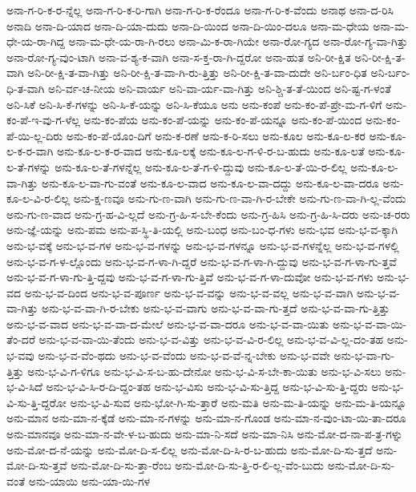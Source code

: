 {ಅನಾ-ಗ-ರಿ-ಕ-ರ-ನ್ನೆಲ್ಲ
ಅನಾ-ಗ-ರಿ-ಕ-ರಿ-ಗಾಗಿ
ಅನಾ-ಗ-ರಿ-ಕ-ರೆಂದೂ
ಅನಾ-ಗ-ರಿ-ಕ-ವೆಂದು
ಅನಾಥ
ಅನಾ-ದ-ರಿಸಿ
ಅನಾದಿ
ಅನಾ-ದಿ-ಯಾದ
ಅನಾ-ದಿ-ಯಾ-ದುದು
ಅನಾ-ದಿ-ಯಿಂದ
ಅನಾ-ದಿ-ಯಿಂ-ದಲೂ
ಅನಾ-ಮ-ಧೇಯ
ಅನಾ-ಮ-ಧೇ-ಯ-ರಾ-ಗಿದ್ದ
ಅನಾ-ಮ-ಧೇ-ಯ-ರಾ-ಗಿ-ರಲು
ಅನಾ-ಮಿ-ಕ-ರಾ-ಗಿಯೇ
ಅನಾ-ರೋ-ಗ್ಯದ
ಅನಾ-ರೋ-ಗ್ಯ-ವಾ-ಗಿತ್ತು
ಅನಾ-ರೋ-ಗ್ಯ-ವುಂ-ಟಾಗಿ
ಅನಾ-ವ-ಶ್ಯ-ಕ-ವಾಗಿ
ಅನಾ-ಸ-ಕ್ತ-ರಾ-ಗಿ-ದ್ದರೋ
ಅನಾ-ಹುತ
ಅನಿ-ರೀ-ಕ್ಷಿತ
ಅನಿ-ರೀ-ಕ್ಷಿ-ತ-ವಾಗಿ
ಅನಿ-ರೀ-ಕ್ಷಿ-ತ-ವಾ-ಗಿತ್ತು
ಅನಿ-ರೀ-ಕ್ಷಿ-ತ-ವಾ-ಗಿ-ರು-ತ್ತಿತ್ತು
ಅನಿ-ರೀ-ಕ್ಷಿ-ತ-ವಾ-ದುದೇ
ಅನಿ-ರ್ಬಂ-ಧಿತ
ಅನಿ-ರ್ಬಂ-ಧಿ-ತ-ವಾಗಿ
ಅನಿ-ರ್ವ-ಚ-ನೀಯ
ಅನಿ-ವಾರ್ಯ
ಅನಿ-ವಾ-ರ್ಯ-ವಾ-ಗಿತ್ತು
ಅನಿ-ಶ್ಚಿ-ತ-ತೆ-ಯಿಂದ
ಅನಿ-ಷ್ಟ-ಗ-ಳಂತೆ
ಅನಿ-ಸಿಕೆ
ಅನಿ-ಸಿ-ಕೆ-ಗಳನ್ನು
ಅನಿ-ಸಿ-ಕೆ-ಯನ್ನು
ಅನಿ-ಸಿ-ಕೆಯೂ
ಅನು
ಅನು-ಕಂಪೆ
ಅನು-ಕಂ-ಪೆ-ಪ್ರೇ-ಮ-ಗ-ಳಿಗೆ
ಅನು-ಕಂ-ಪೆ-ಇ-ವು-ಗ-ಳೆಲ್ಲ
ಅನು-ಕಂ-ಪೆಯ
ಅನು-ಕಂ-ಪೆ-ಯನ್ನು
ಅನು-ಕಂ-ಪೆ-ಯನ್ನೂ
ಅನು-ಕಂ-ಪೆ-ಯಿಂದ
ಅನು-ಕಂ-ಪೆ-ಯಿ-ಲ್ಲ-ದಿರು
ಅನು-ಕಂ-ಪೆ-ಯೊಂ-ದಿಗೆ
ಅನು-ಕ-ರಣೆ
ಅನು-ಕ-ರಿ-ಸಲು
ಅನು-ಕೂಲ
ಅನು-ಕೂ-ಲ-ಕರ
ಅನು-ಕೂ-ಲ-ಕ-ರ-ವಾಗಿ
ಅನು-ಕೂ-ಲ-ಕ-ರ-ವಾದ
ಅನು-ಕೂ-ಲಕ್ಕೆ
ಅನು-ಕೂ-ಲ-ಗ-ಳಿ-ರ-ಬ-ಹುದು
ಅನು-ಕೂ-ಲತೆ
ಅನು-ಕೂ-ಲ-ತೆ-ಗಳನ್ನು
ಅನು-ಕೂ-ಲ-ತೆ-ಗಳನ್ನೆಲ್ಲ
ಅನು-ಕೂ-ಲ-ತೆ-ಗ-ಳಿ-ದ್ದುವು
ಅನು-ಕೂ-ಲ-ತೆ-ಯಿ-ರ-ಲಿಲ್ಲ
ಅನು-ಕೂ-ಲ-ವಾ-ಗಿತ್ತು
ಅನು-ಕೂ-ಲ-ವಾ-ಗು-ವಂತೆ
ಅನು-ಕೂ-ಲ-ವಾದ
ಅನು-ಕೂ-ಲ-ವಾ-ದದ್ದು
ಅನು-ಕೂ-ಲ-ವಾ-ದರೂ
ಅನು-ಕೂ-ಲ-ವಿ-ರ-ಲಿಲ್ಲ
ಅನು-ಕ್ಷ-ಣವೂ
ಅನು-ಗು-ಣ-ವಾಗಿ
ಅನು-ಗು-ಣ-ವಾ-ಗಿ-ರ-ಬೇಕೇ
ಅನು-ಗು-ಣ-ವಾ-ಗಿ-ಲ್ಲ-ವೆಂದು
ಅನು-ಗು-ಣ-ವಾದ
ಅನು-ಗ್ರ-ಹ-ವಿ-ಲ್ಲದೆ
ಅನು-ಗ್ರ-ಹಿ-ಸ-ಬೇ-ಕೆಂದು
ಅನು-ಗ್ರ-ಹಿಸಿ
ಅನು-ಗ್ರ-ಹಿ-ಸಿ-ದರು
ಅನು-ಚ-ರರು
ಅನು-ಜ್ಞೆ-ಯನ್ನು
ಅನು-ಪಮ
ಅನು-ಪ-ಸ್ಥಿ-ತಿ-ಯಲ್ಲಿ
ಅನು-ಬಂಧ
ಅನು-ಬಂ-ಧ-ಗಳು
ಅನು-ಭವ
ಅನು-ಭ-ವ-ಕ್ಕಾಗಿ
ಅನು-ಭ-ವಕ್ಕೆ
ಅನು-ಭ-ವ-ಗಳ
ಅನು-ಭ-ವ-ಗಳನ್ನು
ಅನು-ಭ-ವ-ಗಳನ್ನೂ
ಅನು-ಭ-ವ-ಗಳನ್ನೆಲ್ಲ
ಅನು-ಭ-ವ-ಗಳಲ್ಲಿ
ಅನು-ಭ-ವ-ಗ-ಳ-ಲ್ಲೊಂದು
ಅನು-ಭ-ವ-ಗ-ಳಾ-ಗಿ-ದ್ದರೆ
ಅನು-ಭ-ವ-ಗ-ಳಾ-ಗಿ-ದ್ದುವು
ಅನು-ಭ-ವ-ಗ-ಳಾ-ಗು-ತ್ತವೆ
ಅನು-ಭ-ವ-ಗ-ಳಾ-ಗು-ತ್ತಿ-ದ್ದವು
ಅನು-ಭ-ವ-ಗ-ಳಾ-ಗು-ತ್ತಿವೆ
ಅನು-ಭ-ವ-ಗ-ಳಾ-ದುವೋ
ಅನು-ಭ-ವ-ಗಳು
ಅನು-ಭ-ವದ
ಅನು-ಭ-ವ-ದಿಂದ
ಅನು-ಭ-ವ-ಪೂರ್ಣ
ಅನು-ಭ-ವ-ವನ್ನು
ಅನು-ಭ-ವ-ವಲ್ಲ
ಅನು-ಭ-ವ-ವಾಗಿ
ಅನು-ಭ-ವ-ವಾ-ಗಿತ್ತು
ಅನು-ಭ-ವ-ವಾ-ಗಿ-ರ-ಬೇಕು
ಅನು-ಭ-ವ-ವಾಗು
ಅನು-ಭ-ವ-ವಾ-ಗು-ತ್ತದೆ
ಅನು-ಭ-ವ-ವಾ-ಗು-ತ್ತಿತ್ತು
ಅನು-ಭ-ವ-ವಾದ
ಅನು-ಭ-ವ-ವಾ-ದ-ಮೇಲೆ
ಅನು-ಭ-ವ-ವಾ-ದರೂ
ಅನು-ಭ-ವ-ವಾ-ಯಿತು
ಅನು-ಭ-ವ-ವಾ-ಯಿ-ತೆಂ-ದರೆ
ಅನು-ಭ-ವ-ವಾ-ಯಿ-ತೆಂದು
ಅನು-ಭ-ವ-ವಿತ್ತು
ಅನು-ಭ-ವ-ವಿ-ರ-ಲಿಲ್ಲ
ಅನು-ಭ-ವ-ವಿ-ಲ್ಲ-ದಂ-ತಹ
ಅನು-ಭ-ವವು
ಅನು-ಭ-ವ-ವೆಂ-ಥದು
ಅನು-ಭ-ವ-ವೆಂದು
ಅನು-ಭ-ವ-ವೆ-ನ್ನ-ಬೇಕು
ಅನು-ಭ-ವವೇ
ಅನು-ಭ-ವಾ-ಗು-ತ್ತಿತ್ತು
ಅನು-ಭ-ವಿ-ಗ-ಳಿಗೂ
ಅನು-ಭ-ವಿ-ಸ-ಬ-ಹು-ದೇನೋ
ಅನು-ಭ-ವಿ-ಸ-ಬೇ-ಕಾ-ಯಿತು
ಅನು-ಭ-ವಿ-ಸಲು
ಅನು-ಭ-ವಿ-ಸಿದೆ
ಅನು-ಭ-ವಿ-ಸಿ-ರ-ದಿ-ದ್ದಂ-ತಹ
ಅನು-ಭ-ವಿಸು
ಅನು-ಭ-ವಿ-ಸು-ತ್ತಿದ್ದ
ಅನು-ಭ-ವಿ-ಸು-ತ್ತಿ-ದ್ದರು
ಅನು-ಭ-ವಿ-ಸು-ತ್ತಿ-ದ್ದರೋ
ಅನು-ಭ-ವಿ-ಸುವ
ಅನು-ಭೋ-ಗಿ-ಸು-ತ್ತಾರೆ
ಅನು-ಮತಿ
ಅನು-ಮ-ತಿ-ಯನ್ನು
ಅನು-ಮ-ತಿ-ಯನ್ನೂ
ಅನು-ಮಾನ
ಅನು-ಮಾ-ನ-ಕ್ಕೆಡೆ
ಅನು-ಮಾ-ನ-ಗಳನ್ನು
ಅನು-ಮಾ-ನ-ಗೊಂಡ
ಅನು-ಮಾ-ನ-ವುಂ-ಟಾ-ಯಿ-ತಾ-ದರೂ
ಅನು-ಮಾನವೂ
ಅನು-ಮಾ-ನ-ವೇ-ಳ-ಬ-ಹುದು
ಅನು-ಮಾ-ನಿ-ಸದೆ
ಅನು-ಮಾ-ನಿಸಿ
ಅನು-ಮೋ-ದ-ನಾ-ಪ-ತ್ರ-ಗಳ್ನು
ಅನು-ಮೋ-ದ-ನೆ-ಯನ್ನು
ಅನು-ಮೋ-ದಿ-ಸ-ಲಿಲ್ಲ
ಅನು-ಮೋ-ದಿ-ಸಿ-ರ-ಬ-ಹುದು
ಅನು-ಮೋ-ದಿ-ಸು-ತ್ತದೆ
ಅನು-ಮೋ-ದಿ-ಸು-ತ್ತವೆ
ಅನು-ಮೋ-ದಿ-ಸು-ತ್ತಾ-ರೆಂಬ
ಅನು-ಮೋ-ದಿ-ಸು-ತ್ತಿ-ರ-ಲಿ-ಲ್ಲ-ವೆಂ-ಬುದು
ಅನು-ಮೋ-ದಿ-ಸು-ವಂತೆ
ಅನು-ಯಾಯಿ
ಅನು-ಯಾ-ಯಿ-ಗಳ
}
